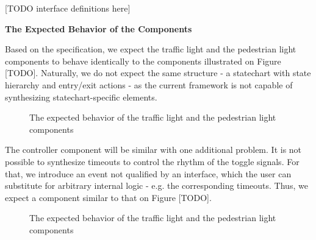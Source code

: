[TODO interface definitions here]

\textbf{The Expected Behavior of the Components} 

Based on the specification, we expect the traffic light and the pedestrian light components to behave identically to the components illustrated on Figure [TODO]. Naturally, we do not expect the same structure - a statechart with state hierarchy and entry/exit actions - as the current framework is not capable of synthesizing statechart-specific elements. 

\begin{figure}[!ht] 
	\centering
	\caption{The expected behavior of the traffic light and the pedestrian light components} 
	\label{fig_casestudy_expecteds}
\end{figure}

The controller component will be similar with one additional problem. It is not possible to synthesize timeouts to control the rhythm of the toggle signals. For that, we introduce an event not qualified by an interface, which the user can substitute for arbitrary internal logic - e.g. the corresponding timeouts. Thus, we expect a component similar to that on Figure [TODO].

\begin{figure}[!ht] 
	\centering
	\caption{The expected behavior of the traffic light and the pedestrian light components} 
	\label{fig_casestudy_expectedcontroller}
\end{figure}


